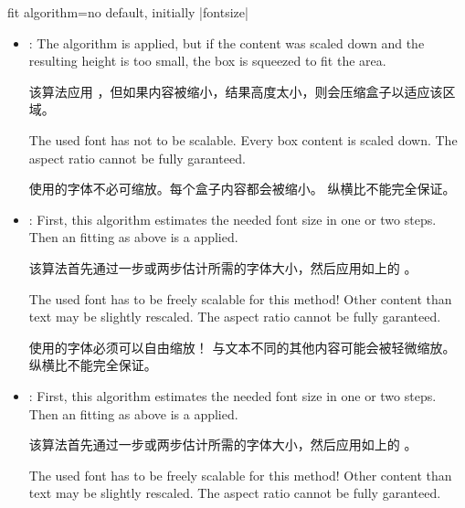 \begin{docTcbKey}{fit algorithm}{=}{no default, initially |fontsize|}
\begin{itemize}
该算法在不缩放字体的情况下计算文本的面积大小。
文本框根据所需的纵横比在一步或两步中形成，最后使用标准的 |\resizebox| 宏进行缩小。
    \begin{marker}
    The used font has not to be scalable. Every box content is scaled down.
    The aspect ratio cannot be fully garanteed.

使用的字体不必可缩放。每个盒子内容都会被缩小。
纵横比不能完全保证。
    \end{marker}
  \item{}:
    The  algorithm is applied, but if the content was scaled
    down and the resulting height is too small, the box is squeezed to fit the area.

    该算法应用 ，但如果内容被缩小，结果高度太小，则会压缩盒子以适应该区域。
    \begin{marker}
    The used font has not to be scalable. Every box content is scaled down.
    The aspect ratio cannot be fully garanteed.

使用的字体不必可缩放。每个盒子内容都会被缩小。
纵横比不能完全保证。
    \end{marker}
  \item{}:
    First, this algorithm estimates the needed font size in one or two steps.
    Then an  fitting as above is a applied.

    该算法首先通过一步或两步估计所需的字体大小，然后应用如上的  。
    \begin{marker}
    The used font has to be freely scalable for this method!
    Other content than text may be slightly rescaled.
    The aspect ratio cannot be fully garanteed.

使用的字体必须可以自由缩放！
与文本不同的其他内容可能会被轻微缩放。
纵横比不能完全保证。
    \end{marker}
  \item{}:
    First, this algorithm estimates the needed font size in one or two steps.
    Then an  fitting as above is a applied.

    该算法首先通过一步或两步估计所需的字体大小，然后应用如上的  。
    \begin{marker}
The used font has to be freely scalable for this method!
Other content than text may be slightly rescaled.
The aspect ratio cannot be fully garanteed.


\end{marker}
\end{itemize}
\end{docTcbKey}
